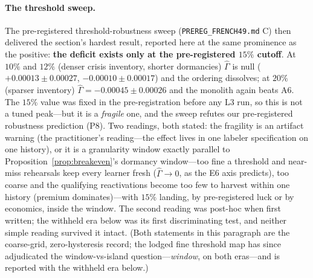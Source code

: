 \documentclass{article}
\begin{document}
\paragraph{The threshold sweep.} The pre-registered threshold-robustness
sweep (\texttt{PREREG\_FRENCH49.md} C) then delivered the section's
hardest result, reported here at the same prominence as the positive:
\textbf{the deficit exists only at the pre-registered $15\%$ cutoff}.
At $10\%$ and $12\%$ (denser crisis inventory, shorter dormancies)
$\hat\Gamma$ is null ($+0.00013 \pm 0.00027$, $-0.00010 \pm 0.00017$)
and the ordering dissolves; at $20\%$ (sparser inventory)
$\hat\Gamma = -0.00045 \pm 0.00026$ and the monolith again beats A6.
The $15\%$ value was fixed in the pre-registration before any L3 run,
so this is not a tuned peak---but it is a \emph{fragile} one, and the
sweep refutes our pre-registered robustness prediction (P8). Two
readings, both stated: the fragility is an artifact warning (the
practitioner's reading---the effect lives in one labeler
specification on one history), or it is a granularity window exactly
parallel to Proposition~\ref{prop:breakeven}'s dormancy window---too
fine a threshold and near-miss rehearsals keep every learner fresh
($\hat\Gamma \to 0$, as the E6 axis predicts), too coarse and the
qualifying reactivations become too few to harvest within one history
(premium dominates)---with $15\%$ landing, by pre-registered luck or
by economics, inside the window. The second reading was post-hoc when
first written; the withheld era below was its first discriminating
test, and neither simple reading survived it intact. (Both
statements in this paragraph are the coarse-grid, zero-hysteresis
record; the lodged fine threshold map has since adjudicated the
window-vs-island question---\emph{window}, on both eras---and is
reported with the withheld era below.)
\end{document}
